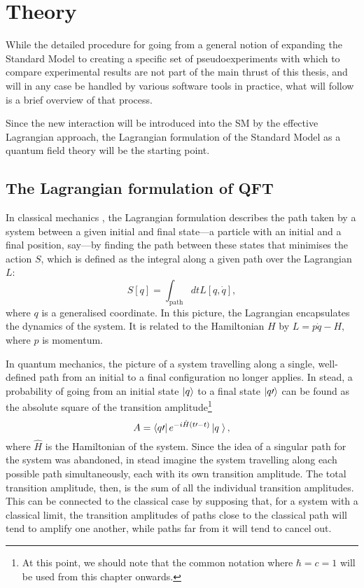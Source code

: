 \chapter{Theory}\label{ch.theory}

While the detailed procedure for going from a general notion of expanding the Standard Model to creating a specific set of pseudoexperiments with which to compare experimental results are not part of the main thrust of this thesis, and will in any case be handled by various software tools in practice, what will follow is a brief overview of that process.

Since the new interaction will be introduced into the SM by the effective Lagrangian approach, the Lagrangian formulation of the Standard Model as a quantum field theory will be the starting point.

\section{The Lagrangian formulation of QFT}
In classical mechanics \cite{goldstein}, the Lagrangian formulation describes the path taken by a system between a given initial and final state---a particle with an initial and a final position, say---by finding the path between these states that minimises the action $S$, which is defined as the integral along a given path over the Lagrangian $L$:
\[S[q]=\int_\textrm{path}dtL[q,\dot{q}],\]
where $q$ is a generalised coordinate. In this picture, the Lagrangian encapsulates the dynamics of the system. It is related to the Hamiltonian $H$ by
\(L = p\dot q- H,\label{htol}\)
where $p$ is momentum.

In quantum mechanics, the picture of a system travelling along a single, well-defined path from an initial to a final configuration no longer applies. In stead, a probability of going from an initial state $\left| q \right\rangle$ to a final state $\left| q\prime \right\rangle$ can be found as the absolute square of the transition amplitude\footnote{At this point, we should note that the common notation where $\hbar = c = 1$ will be used from this chapter onwards.} \cite{srednicki}
\[A=\bra{q\prime}e^{-i\hat H(t\prime-t)}\ket{q\phantom\prime},\]
where $\hat H$ is the Hamiltonian of the system. Since the idea of a singular path for the system was abandoned, in stead imagine the system travelling along each possible path simultaneously, each with its own transition amplitude. The total transition amplitude, then, is the sum of all the individual transition amplitudes. This can be connected to the classical case by supposing that, for a system with a classical limit, the transition amplitudes of paths close to the classical path will tend to amplify one another, while paths far from it will tend to cancel out.

